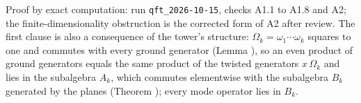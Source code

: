 Proof by exact computation: run \texttt{qft\_2026-10-15}, checks A1.1 to A1.8 and A2; the finite-dimensionality obstruction is the corrected form of A2 after review. The first clause is also a consequence of the tower's structure: $\Omega_{k} = \omega_{1}\cdots\omega_{k}$ squares to one and commutes with every ground generator (Lemma ), so an even product of ground generators equals the same product of the twisted generators $x\,\Omega_{k}$ and lies in the subalgebra $A_{k}$, which commutes elementwise with the subalgebra $B_{k}$ generated by the planes (Theorem ); every mode operator lies in $B_{k}$.
